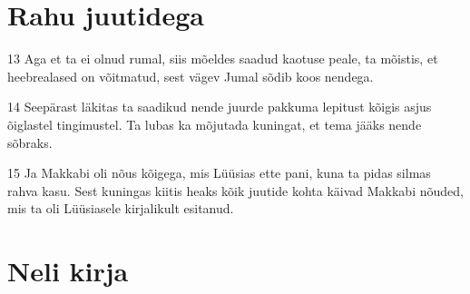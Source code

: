 \section*{Rahu juutidega}

\par 13 Aga et ta ei olnud rumal, siis mõeldes saadud kaotuse peale, ta mõistis, et heebrealased on võitmatud, sest vägev Jumal sõdib koos nendega.
\par 14 Seepärast läkitas ta saadikud nende juurde pakkuma lepitust kõigis asjus õiglastel tingimustel. Ta lubas ka mõjutada kuningat, et tema jääks nende sõbraks.
\par 15 Ja Makkabi oli nõus kõigega, mis Lüüsias ette pani, kuna ta pidas silmas rahva kasu. Sest kuningas kiitis heaks kõik juutide kohta käivad Makkabi nõuded, mis ta oli Lüüsiasele kirjalikult esitanud.


\section*{Neli kirja}

